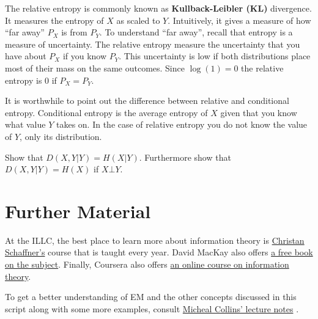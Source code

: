 The relative entropy is commonly known as \textbf{Kullback-Leibler (KL)} divergence. It measures the entropy of $ X $ as scaled to $ Y $. Intuitively,
it gives a measure of how ``far away'' $ P_{X} $ is from $ P_{Y} $. To understand ``far away'', recall that entropy is a measure of uncertainty. The
relative entropy measure the uncertainty that you have about $ P_{X} $ if you know $ P_{Y} $. This uncertainty is low if both distributions place most
of their mass on the same outcomes. Since $ \log(1) = 0 $ the relative entropy is 0 if $ P_{X} = P_{Y} $.

It is worthwhile to point out the difference between relative and conditional entropy. Conditional entropy is the average entropy of $ X $ given that you
know what value $ Y $ takes on. In the case of relative entropy you do not know the value of $ Y $, only its distribution.

\begin{Exercise}
Show that $ D(X,Y|Y) = H(X|Y) $. Furthermore show that $ D(X,Y|Y) = H(X) $ if $ X\bot Y $.
\end{Exercise}

\section*{Further Material}

At the ILLC, the best place to learn more about information theory is \href{http://homepages.cwi.nl/~schaffne/courses/inftheory/2015/}{Christan Schaffner's}
course that is taught every year. David MacKay also offers \href{http://www.inference.phy.cam.ac.uk/itprnn/book.pdf}{a free book on the subject}. Finally,
Coursera also offers \href{https://www.coursera.org/course/informationtheory}{an online course on information theory}.

To get a better understanding of EM and the other concepts discussed in this script along with some more examples, consult 
\href{http://www.cs.columbia.edu/~mcollins/em.pdf}{Micheal Collins' lecture notes} .





